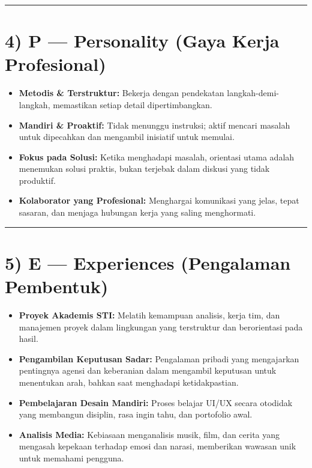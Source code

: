 \documentclass[
  letterpaper,
  DIV=11,
  numbers=noendperiod]{scrreprt}
\providecommand{\tightlist}{%
  \setlength{\itemsep}{0pt}\setlength{\parskip}{0pt}}
\begin{document}
\begin{center}\rule{0.5\linewidth}{0.5pt}\end{center}

\section{4) P --- Personality (Gaya Kerja
Profesional)}\label{p-personality-gaya-kerja-profesional}

\begin{itemize}
\tightlist
\item
  \textbf{Metodis \& Terstruktur:} Bekerja dengan pendekatan
  langkah-demi-langkah, memastikan setiap detail dipertimbangkan.
\item
  \textbf{Mandiri \& Proaktif:} Tidak menunggu instruksi; aktif mencari
  masalah untuk dipecahkan dan mengambil inisiatif untuk memulai.
\item
  \textbf{Fokus pada Solusi:} Ketika menghadapi masalah, orientasi utama
  adalah menemukan solusi praktis, bukan terjebak dalam diskusi yang
  tidak produktif.
\item
  \textbf{Kolaborator yang Profesional:} Menghargai komunikasi yang
  jelas, tepat sasaran, dan menjaga hubungan kerja yang saling
  menghormati.
\end{itemize}

\begin{center}\rule{0.5\linewidth}{0.5pt}\end{center}

\section{5) E --- Experiences (Pengalaman
Pembentuk)}\label{e-experiences-pengalaman-pembentuk}

\begin{itemize}
\tightlist
\item
  \textbf{Proyek Akademis STI:} Melatih kemampuan analisis, kerja tim,
  dan manajemen proyek dalam lingkungan yang terstruktur dan
  berorientasi pada hasil.
\item
  \textbf{Pengambilan Keputusan Sadar:} Pengalaman pribadi yang
  mengajarkan pentingnya agensi dan keberanian dalam mengambil keputusan
  untuk menentukan arah, bahkan saat menghadapi ketidakpastian.
\item
  \textbf{Pembelajaran Desain Mandiri:} Proses belajar UI/UX secara
  otodidak yang membangun disiplin, rasa ingin tahu, dan portofolio
  awal.
\item
  \textbf{Analisis Media:} Kebiasaan menganalisis musik, film, dan
  cerita yang mengasah kepekaan terhadap emosi dan narasi, memberikan
  wawasan unik untuk memahami pengguna.
\end{itemize}
\end{document}
